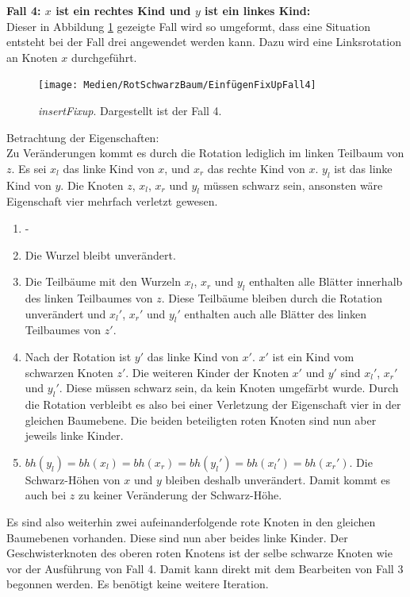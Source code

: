 \documentclass[a4paper,12pt]{article}
\begin{document}
\noindent\textbf{Fall 4: $x$ ist ein rechtes Kind und $y$ ist ein linkes Kind: }\\      
Dieser in Abbildung \ref{fig:EinfügenFixUpFall4} gezeigte Fall wird so umgeformt, dass eine Situation entsteht bei der Fall drei angewendet werden kann. Dazu wird eine Linksrotation an Knoten $x$ durchgeführt.\\
\begin{figure}[H]
	\centering
	\texttt{[image: Medien/RotSchwarzBaum/EinfügenFixUpFall4]}
	\caption{\textit{insertFixup}. Dargestellt ist der Fall 4.  }
	\label{fig:EinfügenFixUpFall4}
\end{figure}
\noindent Betrachtung der Eigenschaften:\\
Zu Veränderungen kommt es durch die Rotation lediglich im linken Teilbaum von $z$. Es sei $x_l$ das linke Kind von $x$,  und $x_r$ das rechte Kind von $x$. $y_l$ ist das linke Kind von $y$. Die Knoten $z$, $x_l$, $x_r$ und $y_l$ müssen schwarz sein, ansonsten wäre Eigenschaft vier mehrfach verletzt gewesen.
\begin{enumerate}
	\item -
	\item Die Wurzel bleibt unverändert.
	\item  Die Teilbäume mit den Wurzeln $x_l$, $x_r$ und $y_l$ enthalten alle Blätter innerhalb des linken Teilbaumes von $z$. Diese Teilbäume bleiben durch die Rotation unverändert und ${x_l}'$, ${x_r}'$ und ${y_l}'$ enthalten auch alle Blätter des linken Teilbaumes von $z'$.
	\item Nach der Rotation ist $y'$ das linke Kind von $x'$. $x'$ ist ein Kind vom schwarzen Knoten $z'$. Die weiteren Kinder der Knoten $x'$ und $y'$ sind ${x_l}'$, ${x_r}'$ und ${y_l}'$. Diese müssen schwarz sein, da kein Knoten umgefärbt wurde. Durch die Rotation verbleibt es also bei einer Verletzung der Eigenschaft vier in der gleichen Baumebene. Die beiden beteiligten roten Knoten sind nun aber jeweils linke Kinder.   
	\item $ \mathit{bh(y_l)} = \mathit{bh(x_l)} = \mathit{bh(x_r)} = \mathit{bh({y_l}')} = \mathit{bh({x_l}')} = \mathit{bh({x_r}')} $. Die Schwarz-Höhen von $x$ und $y$ bleiben deshalb unverändert. Damit kommt es auch bei $z$ zu keiner Veränderung der Schwarz-Höhe. 
\end{enumerate}  

\noindent Es sind also weiterhin zwei aufeinanderfolgende rote Knoten in den gleichen Baumebenen vorhanden. Diese sind nun aber beides linke Kinder. Der Geschwisterknoten des oberen roten Knotens ist der selbe schwarze Knoten wie vor der Ausführung von Fall 4. Damit kann direkt mit dem Bearbeiten von Fall 3 begonnen werden. Es benötigt keine weitere Iteration.\\
\end{document}
